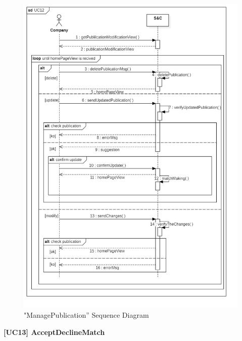\documentclass{article}
\begin{document}
\begin{figure}[H]
    \centering
    \includegraphics[width=1\linewidth]{sequenceDiagrams/UC12.jpg}
    \caption{"ManagePublication” Sequence Diagram}
    \label{fig:enter-label}
\end{figure}

\vspace{1cm}
\textbf{[UC13] AcceptDeclineMatch}
\end{document}
